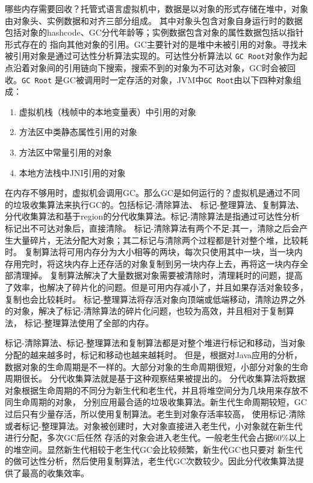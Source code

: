 哪些内存需要回收？托管式语言虚拟机中，数据是以对象的形式存储在堆中，对象由对象头、实例数据和对齐三部分组成。
其中对象头包含对象自身运行时的数据包括对象的hashcode、GC分代年龄等；实例数据包含对象的属性数据包括以指针形式存在的
指向其他对象的引用。GC主要针对的是堆中未被引用的对象。寻找未被引用对象是通过可达性分析算法实现的。可达性分析算法以
\texttt{GC Root}对象作为起点沿着对象间的引用链向下搜索，搜索不到的对象为不可达对象，GC时会被回收。\texttt{GC Root}
是GC被调用时一定存活的对象，JVM中\texttt{GC Root}由以下四种对象组成：
\begin{enumerate}
    \item 虚拟机栈（栈帧中的本地变量表）中引用的对象
    \item 方法区中类静态属性引用的对象
    \item 方法区中常量引用的对象
    \item 本地方法栈中JNI引用的对象
\end{enumerate}

在内存不够用时，虚拟机会调用GC。那么GC是如何运行的？虚拟机是通过不同的垃圾收集算法来执行GC的。包括标记-清除算法、
标记-整理算法、复制算法、分代收集算法和基于region的分代收集算法。标记-清除算法是指通过可达性分析标记出不可达对象后，直接清除。
标记-清除算法有两个不足:其一，清除之后会产生大量碎片，无法分配大对象；其二标记与清除两个过程都是针对整个堆，比较耗时。
复制算法将可用内存分为大小相等的两块，每次只使用其中一块，当一块内存用完时，将这块内存上还存活的对象复制到另一块内存上去，再将这一块内存全部清理掉。
复制算法解决了大量数据对象需要被清除时，清理耗时的问题，提高了效率，也解决了碎片化的问题。但是可用内存减小了，并且如果存活对象较多，复制也会比较耗时。
标记-整理算法将存活对象向顶端或低端移动，清除边界之外的对象，解决了标记-清除算法的碎片化问题，也较为高效，并且相对于复制算法，
标记-整理算法使用了全部的内存。

标记-清除算法、标记-整理算法和复制算法都是对整个堆进行标记和移动，当对象分配的越来越多时，标记和移动也越来越耗时。
但是，根据对Java应用的分析，数据对象的生命周期是不一样的。大部分对象的生命周期很短，小部分对象的生命周期很长。
分代收集算法就是基于这种观察结果被提出的。
分代收集算法将数据对象根据生命周期的不同分为新生代和老生代，并且将堆空间分为几块用来存放不同生命周期的对象，
分别应用最合适的垃圾收集算法。新生代生命周期较短，GC过后只有少量存活，所以使用复制算法。老生到对象存活率较高，
使用标记-清除或者标记-整理算法。对象被创建时，大对象直接进入老生代，小对象就在新生代进行分配，多次GC后任然
存活的对象会进入老生代。一般老生代会占据60\%以上的堆空间。显然新生代相较于老生代GC会比较频繁，新生代GC也只要对
新生代的做可达性分析，然后使用复制算法，老生代GC次数较少。因此分代收集算法提供了最高的收集效率。

